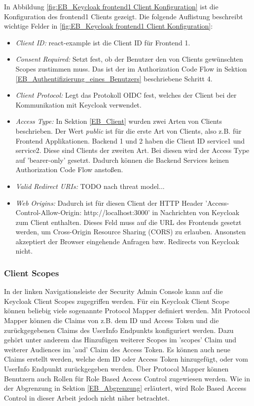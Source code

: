 In Abbildung \ref{fig:EB_Keycloak frontend1 Client Konfiguration} ist die Konfiguration des frontend1 Clients gezeigt. Die folgende Auflistung beschreibt wichtige Felder in \ref{fig:EB_Keycloak frontend1 Client Konfiguration}:
\begin{itemize}
	\item \emph{Client ID:} react-example ist die Client ID für Frontend 1.
	\item \emph{Consent Required:} Setzt fest, ob der Benutzer den von Clients gewünschten Scopes zustimmen muss. Das ist der im Authorization Code Flow in Sektion \ref{EB_Authentifizierung_eines_Benutzers} beschriebene Schritt 4.
	\item \emph{Client Protocol:} Legt das Protokoll OIDC fest, welches der Client bei der Kommunikation mit Keycloak verwendet.
	\item \emph{Access Type:} In Sektion \ref{EB_Client} wurden zwei Arten von Clients beschrieben. Der Wert \textit{public} ist für die erste Art von Clients, also z.B. für Frontend Applikationen. Backend 1 und 2 haben die Client ID service1 und service2. Diese sind Clients der zweiten Art. Bei diesen wird der Access Type auf 'bearer-only' gesetzt. Dadurch können die Backend Services keinen Authorization Code Flow anstoßen.
	\item \emph{Valid Redirect URIs:} TODO nach threat model...
	\item \emph{Web Origins:} Dadurch ist für diesen Client der HTTP Header 'Access-Control-Allow-Origin: http://localhost:3000' in Nachrichten von Keycloak zum Client enthalten. Dieses Feld muss auf die URL des Frontends gesetzt werden, um Cross-Origin Resource Sharing (CORS) zu erlauben. Ansonsten akzeptiert der Browser eingehende Anfragen bzw. Redirects von Keycloak nicht.
\end{itemize}

\subsubsection{Client Scopes}

In der linken Navigationsleiste der Security Admin Console kann auf die Keycloak Client Scopes zugegriffen werden. Für ein Keycloak Client Scope können beliebig viele sogenannte Protocol Mapper definiert werden. Mit Protocol Mapper können die Claims von z.B. dem ID und Access Token und die zurückgegebenen Claims des UserInfo Endpunkts konfiguriert werden. Dazu gehört unter anderem das Hinzufügen weiterer Scopes im 'scopes' Claim und weiterer Audiences im 'aud' Claim des Access Token. Es können auch neue Claims erstellt werden, welche dem ID oder Access Token hinzugefügt, oder vom UserInfo Endpunkt zurückgegeben werden. Über Protocol Mapper können Benutzern auch Rollen für Role Based Access Control zugewiesen werden. Wie in der Abgrenzung in Sektion \ref{EB_Abgrenzung} erläutert, wird Role Based Access Control in dieser Arbeit jedoch nicht näher betrachtet. 

